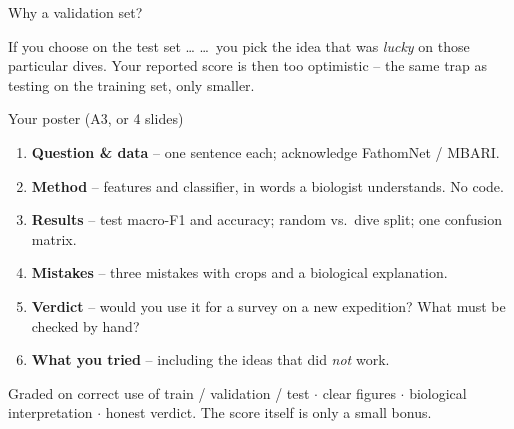 \documentclass[aspectratio=169,11pt]{beamer}
\begin{document}
\begin{frame}{Why a validation set?}
\centering
{}

\vspace{12pt}
\begin{alertblock}{If you choose on the test set \dots}
\dots\ you pick the idea that was \emph{lucky} on those particular dives. Your reported score is then too optimistic --
the same trap as testing on the training set, only smaller.
\end{alertblock}
\end{frame}

\begin{frame}{Your poster (A3, or 4 slides)}
\small
\begin{enumerate}
  \item \textbf{Question \& data} -- one sentence each; acknowledge FathomNet / MBARI.
  \item \textbf{Method} -- features and classifier, in words a biologist understands. No code.
  \item \textbf{Results} -- test macro-F1 and accuracy; random vs.\ dive split; one confusion matrix.
  \item \textbf{Mistakes} -- three mistakes with crops and a biological explanation.
  \item \textbf{Verdict} -- would you use it for a survey on a new expedition? What must be checked by hand?
  \item \textbf{What you tried} -- including the ideas that did \emph{not} work.
\end{enumerate}
\vspace{4pt}
\begin{exampleblock}{Graded on}
correct use of train / validation / test $\cdot$ clear figures $\cdot$ biological interpretation $\cdot$ honest verdict. The score itself is only a small bonus.
\end{exampleblock}
\end{frame}
\end{document}
